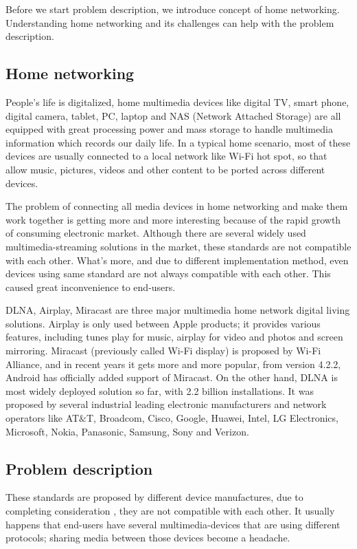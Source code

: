 
Before we start problem description, we introduce concept of home networking.
Understanding home networking and its challenges can help with the problem
description.

\subsection{Home networking}
People's life is digitalized, home multimedia devices like digital TV, smart phone, 
digital camera, tablet, PC, laptop and NAS (Network Attached Storage) are all equipped
 with great processing power and mass storage to handle multimedia information which 
 records our daily life. In a typical home scenario, most of these devices are usually 
 connected to a local network like Wi-Fi hot spot, so that allow music, pictures, videos 
 and other content to be ported across different devices. 

The problem of connecting all media devices in home networking and make them work together 
is getting more and more interesting because of the rapid growth of consuming electronic 
market. Although there are several widely used multimedia-streaming solutions in the market, 
these standards are not compatible with each other. What's more, and due to different 
implementation method, even devices using same standard are not always compatible with 
each other. This caused great inconvenience to end-users.

DLNA, Airplay, Miracast are three major multimedia home network digital living solutions. 
Airplay is only used between Apple products; it provides various features, including tunes 
play for music, airplay for video and photos and screen mirroring. Miracast (previously 
called Wi-Fi display) is proposed by Wi-Fi Alliance, and in recent years it gets more and 
more popular, from version 4.2.2, Android has officially added support of Miracast. On the 
other hand, DLNA is most widely deployed solution so far, with 2.2 billion installations. 
It was proposed by several industrial leading electronic manufacturers and network operators 
like AT$\&$T, Broadcom, Cisco, Google, Huawei, Intel, LG Electronics, Microsoft, Nokia, 
Panasonic, Samsung, Sony and Verizon.


\subsection{Problem description}
These standards are proposed by different device manufactures, due to completing consideration
, they are not compatible with each other. It usually happens that end-users have several 
multimedia-devices that are using different protocols; sharing media between those devices 
become a headache.

